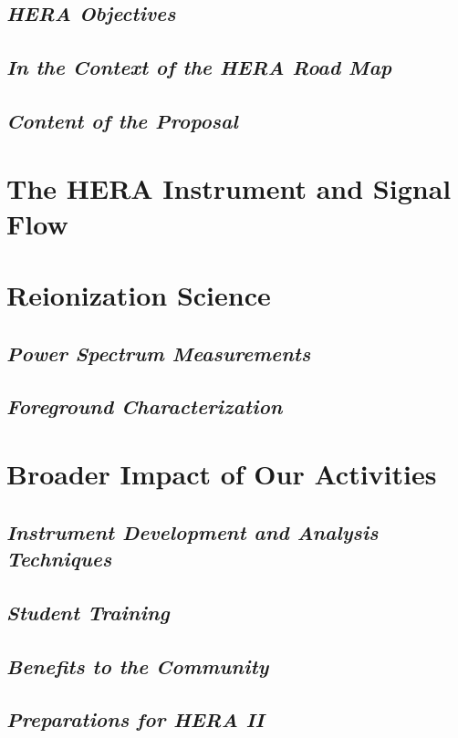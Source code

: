 \documentclass[preprint]{aastex}
\begin{document}
\subsection{\it{HERA Objectives}}

\subsection{\it{In the Context of the HERA Road Map}}

\subsection{\it{Content of the Proposal}}

\section{The HERA Instrument and Signal Flow}

\section{Reionization Science}

\subsection{\it{Power Spectrum Measurements}}

\subsection{\it{Foreground Characterization}}

\section{Broader Impact of Our Activities}

\subsection{\it Instrument Development and Analysis Techniques}

\subsection{\it Student Training}

\subsection{\it Benefits to the Community}

\subsection{\it Preparations for HERA II}
\end{document}
